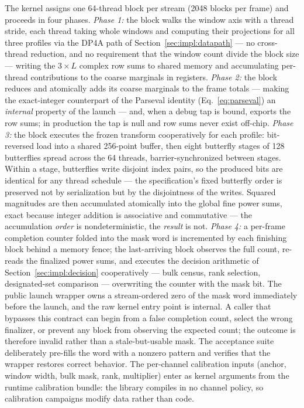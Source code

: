 The kernel assigns one 64-thread block per stream (2048 blocks per frame) and proceeds in four phases. \emph{Phase 1:} the block walks the window axis with a thread stride, each thread taking whole windows and computing their projections for all three profiles via the DP4A path of Section~\ref{sec:impl:datapath} --- no cross-thread reduction, and no requirement that the window count divide the block size --- writing the $3 \times L$ complex row sums to shared memory and accumulating per-thread contributions to the coarse marginals in registers. \emph{Phase 2:} the block reduces and atomically adds its coarse marginals to the frame totals --- making the exact-integer counterpart of the Parseval identity (Eq.~\eqref{eq:parseval}) an \emph{internal} property of the launch --- and, when a debug tap is bound, exports the row sums; in production the tap is null and row sums never exist off-chip. \emph{Phase 3:} the block executes the frozen transform cooperatively for each profile: bit-reversed load into a shared 256-point buffer, then eight butterfly stages of 128 butterflies spread across the 64 threads, barrier-synchronized between stages. Within a stage, butterflies write disjoint index pairs, so the produced bits are identical for any thread schedule --- the specification's fixed butterfly order is preserved not by serialization but by the disjointness of the writes. Squared magnitudes are then accumulated atomically into the global fine power sums, exact because integer addition is associative and commutative --- the accumulation \emph{order} is nondeterministic, the \emph{result} is not. \emph{Phase 4:} a per-frame completion counter folded into the mask word is incremented by each finishing block behind a memory fence; the last-arriving block observes the full count, re-reads the finalized power sums, and executes the decision arithmetic of Section~\ref{sec:impl:decision} cooperatively --- bulk census, rank selection, designated-set comparison --- overwriting the counter with the mask bit.  The public launch wrapper owns a stream-ordered zero of the mask word immediately before the launch, and the raw kernel entry point is internal.  A caller that bypasses this contract can begin from a false completion count, select the wrong finalizer, or prevent any block from observing the expected count; the outcome is therefore invalid rather than a stale-but-usable mask.  The acceptance suite deliberately pre-fills the word with a nonzero pattern and verifies that the wrapper restores correct behavior. The per-channel calibration inputs (anchor, window width, bulk mask, rank, multiplier) enter as kernel arguments from the runtime calibration bundle: the library compiles in no channel policy, so calibration campaigns modify data rather than code.

